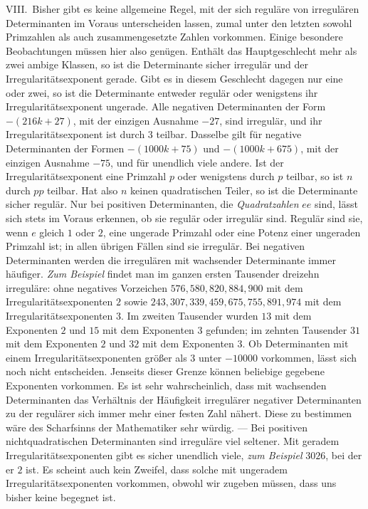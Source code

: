 VIII.\ Bisher gibt es keine allgemeine Regel, mit der sich reguläre von irregulären Determinanten im Voraus unterscheiden lassen, zumal unter den letzten sowohl Primzahlen als auch zusammengesetzte Zahlen vorkommen. Einige besondere Beobachtungen müssen hier also genügen. Enthält das Hauptgeschlecht mehr als zwei ambige Klassen, so ist die Determinante sicher irregulär und der Irregularitätsexponent gerade. Gibt es in diesem Geschlecht dagegen nur eine oder zwei, so ist die Determinante entweder regulär oder wenigstens ihr Irregularitätsexponent ungerade. Alle negativen Determinanten der Form \(-(216k+27)\), mit der einzigen Ausnahme \(-27\), sind irregulär, und ihr Irregularitätsexponent ist durch \(3\) teilbar. Dasselbe gilt für negative Determinanten der Formen \(-(1000k+75)\) und \(-(1000k+675)\), mit der einzigen Ausnahme \(-75\), und für unendlich viele andere. Ist der Irregularitätsexponent eine Primzahl \(p\) oder wenigstens durch \(p\) teilbar, so ist \(n\) durch \(pp\) teilbar. Hat also \(n\) keinen quadratischen Teiler, so ist die Determinante sicher regulär. Nur bei positiven Determinanten, die \textit{Quadratzahlen} \(ee\) sind, lässt sich stets im Voraus erkennen, ob sie regulär oder irregulär sind. Regulär sind sie, wenn \(e\) gleich \(1\) oder \(2\), eine ungerade Primzahl oder eine Potenz einer ungeraden Primzahl ist; in allen übrigen Fällen sind sie irregulär. Bei negativen Determinanten werden die irregulären mit wachsender Determinante immer häufiger. \textit{Zum Beispiel} findet man im ganzen ersten Tausender dreizehn irreguläre: ohne negatives Vorzeichen \(576,580,820,884,900\) mit dem Irregularitätsexponenten \(2\) sowie \(243,307,339,459,675,755,891,974\) mit dem Irregularitätsexponenten \(3\). Im zweiten Tausender wurden \(13\) mit dem Exponenten \(2\) und \(15\) mit dem Exponenten \(3\) gefunden; im zehnten Tausender \(31\) mit dem Exponenten \(2\) und \(32\) mit dem Exponenten \(3\). Ob Determinanten mit einem Irregularitätsexponenten größer als \(3\) unter \(-10000\) vorkommen, lässt sich noch nicht entscheiden. Jenseits dieser Grenze können beliebige gegebene Exponenten vorkommen. Es ist sehr wahrscheinlich, dass mit wachsenden Determinanten das Verhältnis der Häufigkeit irregulärer negativer Determinanten zu der regulärer sich immer mehr einer festen Zahl nähert. Diese zu bestimmen wäre des Scharfsinns der Mathematiker sehr würdig. — Bei positiven nichtquadratischen Determinanten sind irreguläre viel seltener. Mit geradem Irregularitätsexponenten gibt es sicher unendlich viele, \textit{zum Beispiel} \(3026\), bei der er \(2\) ist. Es scheint auch kein Zweifel, dass solche mit ungeradem Irregularitätsexponenten vorkommen, obwohl wir zugeben müssen, dass uns bisher keine begegnet ist.

